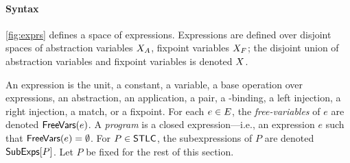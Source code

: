 \paragraph{Syntax}
\autoref{fig:exprs} defines a space of expressions.
%
Expressions are defined over disjoint spaces of abstraction variables
$X_A$, fixpoint variables $X_F$;
%
the disjoint union of abstraction variables and fixpoint variables is
denoted $X$.

An expression is the unit, a constant, a variable, a base operation
over expressions, an abstraction, an application, a pair, a
-binding, a left injection, a right injection, a match, or a
fixpoint.
%
For each $e \in E$, the \emph{free-variables} of $e$ are denoted
$\mathsf{FreeVars}(e)$.
%
A \emph{program} is a closed expression---i.e., an expression $e$
such that $\mathsf{FreeVars}(e) = \emptyset$.
%
For $P \in \mathsf{STLC}$, the subexpressions of $P$ are denoted
$\mathsf{SubExps}[  P  ]$.
%
Let $P$ be fixed for the rest of this section.

